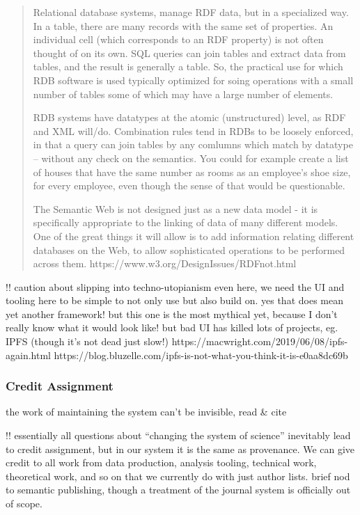 \documentclass[10pt]{article}
\begin{document}
\begin{multicols}{2}
\begin{quote}
Relational database systems, manage RDF data, but in a specialized way.
In a table, there are many records with the same set of properties. An
individual cell (which corresponds to an RDF property) is not often
thought of on its own. SQL queries can join tables and extract data from
tables, and the result is generally a table. So, the practical use for
which RDB software is used typically optimized for soing operations with
a small number of tables some of which may have a large number of
elements.

RDB systems have datatypes at the atomic (unstructured) level, as RDF
and XML will/do. Combination rules tend in RDBs to be loosely enforced,
in that a query can join tables by any comlumns which match by datatype
-- without any check on the semantics. You could for example create a
list of houses that have the same number as rooms as an employee's shoe
size, for every employee, even though the sense of that would be
questionable.

The Semantic Web is not designed just as a new data model - it is
specifically appropriate to the linking of data of many different
models. One of the great things it will allow is to add information
relating different databases on the Web, to allow sophisticated
operations to be performed across them.
https://www.w3.org/DesignIssues/RDFnot.html
\end{quote}

!! caution about slipping into techno-utopianism even here, we need the
UI and tooling here to be simple to not only use but also build on. yes
that does mean yet another framework! but this one is the most mythical
yet, because I don't really know what it would look like! but bad UI has
killed lots of projects, eg. IPFS (though it's not dead just slow!)
https://macwright.com/2019/06/08/ipfs-again.html
https://blog.bluzelle.com/ipfs-is-not-what-you-think-it-is-e0aa8dc69b

\hypertarget{credit-assignment}{%
\subsubsection{Credit Assignment}\label{credit-assignment}}

the work of maintaining the system can't be invisible, read \& cite \cite{classeDistributedInfrastructureSupport2017, bowkerInformationInfrastructureStudies2010} 

!! essentially all questions about ``changing the system of science''
inevitably lead to credit assignment, but in our system it is the same
as provenance. We can give credit to all work from data production,
analysis tooling, technical work, theoretical work, and so on that we
currently do with just author lists. brief nod to semantic publishing,
though a treatment of the journal system is officially out of scope.

\end{multicols}
\end{document}
